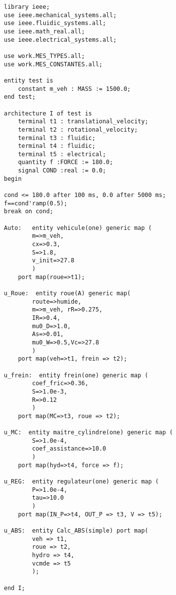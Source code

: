 \begin{verbatim}
library ieee;
use ieee.mechanical_systems.all;
use ieee.fluidic_systems.all;
use ieee.math_real.all;
use ieee.electrical_systems.all;

use work.MES_TYPES.all;
use work.MES_CONSTANTES.all;

entity test is
    constant m_veh : MASS := 1500.0;
end test;

architecture I of test is 
    terminal t1 : translational_velocity;
    terminal t2 : rotational_velocity;
    terminal t3 : fluidic;
    terminal t4 : fluidic; 
    terminal t5 : electrical; 
    quantity f :FORCE := 180.0;
    signal COND :real := 0.0;
begin 

cond <= 180.0 after 100 ms, 0.0 after 5000 ms;
f==cond'ramp(0.5);
break on cond;

Auto: 	entity vehicule(one) generic map (
        m=>m_veh,
        cx=>0.3,
        S=>1.8,
        v_init=>27.8
        ) 
    port map(roue=>t1);

u_Roue:  entity roue(A) generic map(
        route=>humide,
        m=>m_veh, rR=>0.275,
        IR=>0.4,
        mu0_D=>1.0,
        As=>0.01,
        mu0_W=>0.5,Vc=>27.8
        )
    port map(veh=>t1, frein => t2);

u_frein:  entity frein(one) generic map (
        coef_fric=>0.36,
        S=>1.0e-3,
        R=>0.12
        )
    port map(MC=>t3, roue => t2);

u_MC:  entity maitre_cylindre(one) generic map (
        S=>1.0e-4,
        coef_assistance=>10.0
        )
    port map(hyd=>t4, force => f);

u_REG:  entity regulateur(one) generic map (
        P=>1.0e-4,
        tau=>10.0
        )
    port map(IN_P=>t4, OUT_P => t3, V => t5);

u_ABS:  entity Calc_ABS(simple) port map(
        veh => t1,
        roue => t2,
        hydro => t4,
        vcmde => t5
        );

end I; 
\end{verbatim}